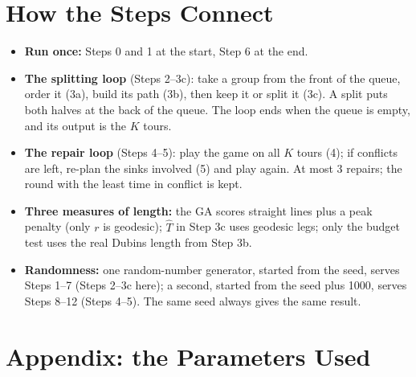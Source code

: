 \documentclass[10pt]{article}
\begin{document}
\section{How the Steps Connect}

\begin{itemize}
  \item \textbf{Run once:} Steps 0 and 1 at the start, Step 6 at the end.
  \item \textbf{The splitting loop} (Steps 2--3c): take a group from the front of the queue, order it (3a), build its
    path (3b), then keep it or split it (3c). A split puts both halves at the back of the queue. The loop ends when the
    queue is empty, and its output is the $K$ tours.
  \item \textbf{The repair loop} (Steps 4--5): play the game on all $K$ tours (4); if conflicts are left, re-plan the
    sinks involved (5) and play again. At most 3 repairs; the round with the least time in conflict is kept.
  \item \textbf{Three measures of length:} the GA scores straight lines plus a peak penalty (only $r$ is geodesic);
    $\hat T$ in Step 3c uses geodesic legs; only the budget test uses the real Dubins length from Step 3b.
  \item \textbf{Randomness:} one random-number generator, started from the seed, serves Steps 1--7 (Steps 2--3c here);
    a second, started from the seed plus 1000, serves Steps 8--12 (Steps 4--5). The same seed always gives the same
    result.
\end{itemize}

\section*{Appendix: the Parameters Used}
\end{document}
